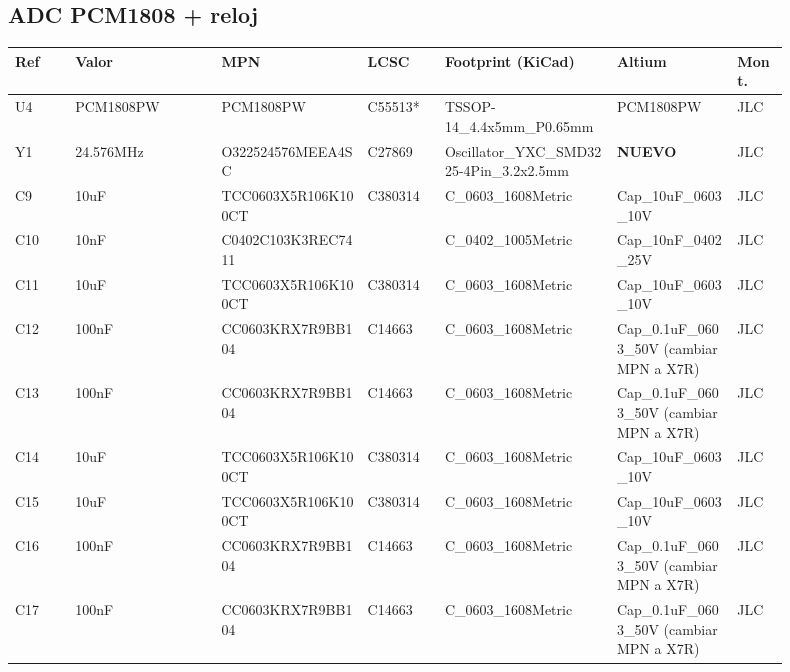 \documentclass[10pt,a4paper]{article}
\begin{document}
\subsection*{ADC PCM1808 + reloj}
{\scriptsize\begin{longtable}{@{}L{0.07\linewidth}L{0.17\linewidth}L{0.17\linewidth}L{0.09\linewidth}L{0.20\linewidth}L{0.14\linewidth}L{0.06\linewidth}@{}}\toprule
\textbf{Ref} & \textbf{Valor} & \textbf{MPN} & \textbf{LCSC} & \textbf{Footprint (KiCad)} & \textbf{Altium} & \textbf{Mont.}\\\midrule\endhead
U4 & PCM1808PW & PCM1808PW & C55513* & TSSOP-14\_\allowbreak{}4.4x5mm\_\allowbreak{}P0.65mm & PCM1808PW & JLC\\
Y1 & 24.576MHz & O322524576MEEA4SC & C27869 & Oscillator\_\allowbreak{}YXC\_\allowbreak{}SMD3225-4Pin\_\allowbreak{}3.2x2.5mm & \textbf{NUEVO} & JLC\\
C9 & 10uF & TCC0603X5R106K100CT & C380314 & C\_\allowbreak{}0603\_\allowbreak{}1608Metric & Cap\_\allowbreak{}10uF\_\allowbreak{}0603\_\allowbreak{}10V & JLC\\
C10 & 10nF & C0402C103K3REC7411 &  & C\_\allowbreak{}0402\_\allowbreak{}1005Metric & Cap\_\allowbreak{}10nF\_\allowbreak{}0402\_\allowbreak{}25V & JLC\\
C11 & 10uF & TCC0603X5R106K100CT & C380314 & C\_\allowbreak{}0603\_\allowbreak{}1608Metric & Cap\_\allowbreak{}10uF\_\allowbreak{}0603\_\allowbreak{}10V & JLC\\
C12 & 100nF & CC0603KRX7R9BB104 & C14663 & C\_\allowbreak{}0603\_\allowbreak{}1608Metric & Cap\_\allowbreak{}0.1uF\_\allowbreak{}0603\_\allowbreak{}50V (cambiar MPN a X7R) & JLC\\
C13 & 100nF & CC0603KRX7R9BB104 & C14663 & C\_\allowbreak{}0603\_\allowbreak{}1608Metric & Cap\_\allowbreak{}0.1uF\_\allowbreak{}0603\_\allowbreak{}50V (cambiar MPN a X7R) & JLC\\
C14 & 10uF & TCC0603X5R106K100CT & C380314 & C\_\allowbreak{}0603\_\allowbreak{}1608Metric & Cap\_\allowbreak{}10uF\_\allowbreak{}0603\_\allowbreak{}10V & JLC\\
C15 & 10uF & TCC0603X5R106K100CT & C380314 & C\_\allowbreak{}0603\_\allowbreak{}1608Metric & Cap\_\allowbreak{}10uF\_\allowbreak{}0603\_\allowbreak{}10V & JLC\\
C16 & 100nF & CC0603KRX7R9BB104 & C14663 & C\_\allowbreak{}0603\_\allowbreak{}1608Metric & Cap\_\allowbreak{}0.1uF\_\allowbreak{}0603\_\allowbreak{}50V (cambiar MPN a X7R) & JLC\\
C17 & 100nF & CC0603KRX7R9BB104 & C14663 & C\_\allowbreak{}0603\_\allowbreak{}1608Metric & Cap\_\allowbreak{}0.1uF\_\allowbreak{}0603\_\allowbreak{}50V (cambiar MPN a X7R) & JLC\\

\end{longtable}}
\end{document}
